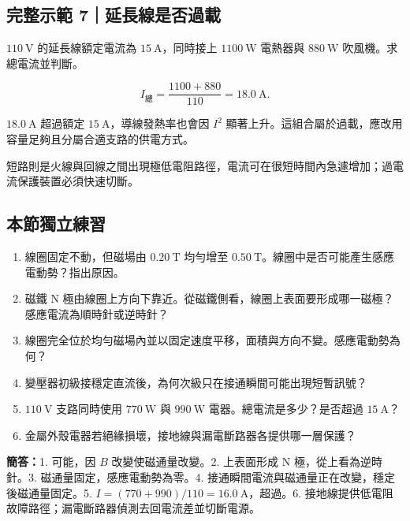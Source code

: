 \documentclass[11pt,a4paper]{article}
\providecommand{\tightlist}{%
  \setlength{\itemsep}{0pt}\setlength{\parskip}{0pt}}
\begin{document}
\begin{HandoutWorkedExample}

\subsection{完整示範 7｜延長線是否過載}\label{ux5b8cux6574ux793aux7bc4-7ux5ef6ux9577ux7ddaux662fux5426ux904eux8f09}

\(110\ \mathrm V\) 的延長線額定電流為 \(15\ \mathrm A\)，同時接上 \(1100\ \mathrm W\) 電熱器與 \(880\ \mathrm W\) 吹風機。求總電流並判斷。

\[
I_{\text{總}}
=\frac{1100+880}{110}
=18.0\ \mathrm A.
\]

\(18.0\ \mathrm A\) 超過額定 \(15\ \mathrm A\)，導線發熱率也會因 \(I^2\) 顯著上升。這組合屬於過載，應改用容量足夠且分屬合適支路的供電方式。

短路則是火線與回線之間出現極低電阻路徑，電流可在很短時間內急遽增加；過電流保護裝置必須快速切斷。

\end{HandoutWorkedExample}

\begin{HandoutSelfCheck}

\subsection{本節獨立練習}\label{ux672cux7bc0ux7368ux7acbux7df4ux7fd2-1}

\begin{enumerate}
\def\labelenumi{\arabic{enumi}.}
\tightlist
\item
  線圈固定不動，但磁場由 \(0.20\ \mathrm T\) 均勻增至 \(0.50\ \mathrm T\)。線圈中是否可能產生感應電動勢？指出原因。
\item
  磁鐵 N 極由線圈上方向下靠近。從磁鐵側看，線圈上表面要形成哪一磁極？感應電流為順時針或逆時針？
\item
  線圈完全位於均勻磁場內並以固定速度平移，面積與方向不變。感應電動勢為何？
\item
  變壓器初級接穩定直流後，為何次級只在接通瞬間可能出現短暫訊號？
\item
  \(110\ \mathrm V\) 支路同時使用 \(770\ \mathrm W\) 與 \(990\ \mathrm W\) 電器。總電流是多少？是否超過 \(15\ \mathrm A\)？
\item
  金屬外殼電器若絕緣損壞，接地線與漏電斷路器各提供哪一層保護？
\end{enumerate}

\textbf{簡答：}1. 可能，因 \(B\) 改變使磁通量改變。2. 上表面形成 N 極，從上看為逆時針。3. 磁通量固定，感應電動勢為零。4. 接通瞬間電流與磁通量正在改變，穩定後磁通量固定。5. \(I=(770+990)/110=16.0\ \mathrm A\)，超過。6. 接地線提供低電阻故障路徑；漏電斷路器偵測去回電流差並切斷電源。

\end{HandoutSelfCheck}
\end{document}
